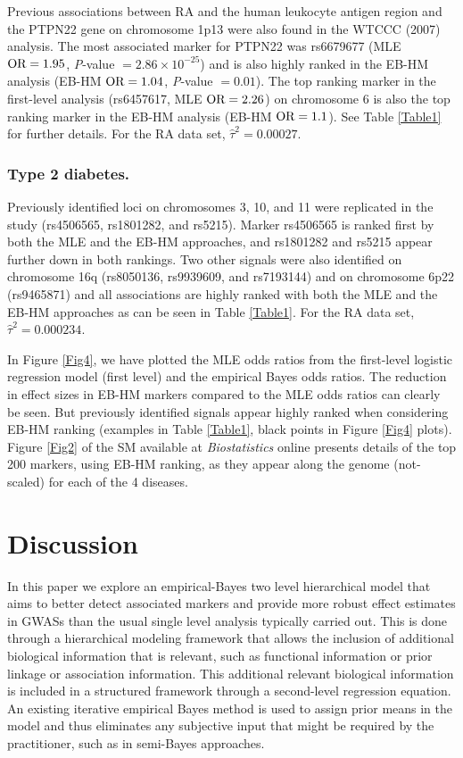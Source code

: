 \documentclass[oupdraft]{bio}
\begin{document}
Previous associations between RA and the human leukocyte
antigen region and the PTPN22 gene on chromosome 1p13
were also found in the WTCCC (2007) analysis.
The most associated marker for PTPN22 was rs6679677
(MLE $\hbox{OR} = 1.95$,
\textit{P}-value $= 2.86 \times 10^{-25}$) and is also
highly ranked in the EB-HM analysis
(EB-HM $\hbox{OR} = 1.04$,
\textit{P}-value $= 0.01$). The top ranking marker in
the first-level analysis (rs6457617, MLE $\hbox{OR} = 2.26$)
on chromosome 6 is also the top ranking marker in the
EB-HM analysis (EB-HM $\hbox{OR} = 1.1$). See
Table \ref{Table1} for further details.
For the RA data set, $\hat{\tau}^2 = 0.00027$.


\subsubsection{Type 2 diabetes.}

Previously identified loci on chromosomes 3, 10, and
11 were replicated in the \citet{Wahba:1990} study
(rs4506565, rs1801282, and rs5215). Marker rs4506565 is
ranked first by both the MLE and the EB-HM approaches,
and rs1801282 and rs5215 appear further down in both
rankings. Two other signals were also identified on
chromosome 16q (rs8050136, rs9939609, and rs7193144) and
on chromosome 6p22 (rs9465871) and all associations are
highly ranked with both the MLE and the EB-HM approaches
as can be seen in Table \ref{Table1}.
For the RA data set, $\hat{\tau}^2 = 0.000234$.

In Figure \ref{Fig4}, we have plotted the MLE odds
ratios from the first-level logistic regression model
(first level) and the empirical Bayes odds ratios. The
reduction in effect sizes in EB-HM markers compared to
the MLE odds ratios can clearly be seen. But previously
identified signals appear highly ranked when considering
EB-HM ranking (examples in Table \ref{Table1}, black points
in Figure \ref{Fig4} plots). Figure \ref{Fig2} of the SM
available at \textit{Biostatistics} online presents details
of the top 200 markers, using EB-HM ranking, as they
appear along the genome (not-scaled) for each of the
4 diseases.


\section{Discussion}
\label{sec4}

In this paper we explore an empirical-Bayes two level
hierarchical model that aims to better detect associated
markers and provide more robust effect estimates in GWASs
than the usual single level analysis typically carried out.
This is done through a hierarchical modeling framework that
allows the inclusion of additional biological information
that is relevant, such as functional information or prior
linkage or association information. This additional relevant
biological information is included in a structured framework
through a second-level regression equation. An existing
iterative empirical Bayes method is used to assign prior
means in the model and thus eliminates any subjective input
that might be required by the practitioner, such as in
semi-Bayes approaches.
\end{document}
